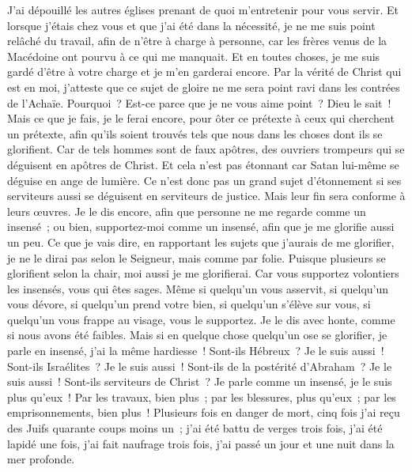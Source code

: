 \begin{multicols}{2}
J'ai dépouillé les autres églises prenant de quoi m'entretenir pour vous servir. Et lorsque j'étais chez vous et que j'ai été dans la nécessité, je ne me suis point relâché du travail, afin de n'être à charge à personne,
car les frères venus de la Macédoine ont pourvu à ce qui me manquait. Et en toutes choses, je me suis gardé d'être à votre charge et je m'en garderai encore.
Par la vérité de Christ qui est en moi, j'atteste que ce sujet de gloire ne me sera point ravi dans les contrées de l'Achaïe.
Pourquoi~? Est-ce parce que je ne vous aime point~? Dieu le sait~!
Mais ce que je fais, je le ferai encore, pour ôter ce prétexte à ceux qui cherchent un prétexte, afin qu'ils soient trouvés tels que nous dans les choses dont ils se glorifient.
Car de tels hommes sont de faux apôtres, des ouvriers trompeurs qui se déguisent en apôtres de Christ.
Et cela n'est pas étonnant car Satan lui-même se déguise en ange de lumière.
Ce n'est donc pas un grand sujet d'étonnement si ses serviteurs aussi se déguisent en serviteurs de justice. Mais leur fin sera conforme à leurs œuvres.
Je le dis encore, afin que personne ne me regarde comme un insensé~; ou bien, supportez-moi comme un insensé, afin que je me glorifie aussi un peu.
Ce que je vais dire, en rapportant les sujets que j'aurais de me glorifier, je ne le dirai pas selon le Seigneur, mais comme par folie.
Puisque plusieurs se glorifient selon la chair, moi aussi je me glorifierai.
Car vous supportez volontiers les insensés, vous qui êtes sages.
Même si quelqu'un vous asservit, si quelqu'un vous dévore, si quelqu'un prend votre bien, si quelqu'un s'élève sur vous, si quelqu'un vous frappe au visage, vous le supportez.
Je le dis avec honte, comme si nous avons été faibles. Mais si en quelque chose quelqu'un ose se glorifier, je parle en insensé, j'ai la même hardiesse~!
Sont-ils Hébreux~? Je le suis aussi~! Sont-ils Israélites~? Je le suis aussi~! Sont-ils de la postérité d'Abraham~? Je le suis aussi~!
Sont-ils serviteurs de Christ~? Je parle comme un insensé, je le suis plus qu'eux~! Par les travaux, bien plus~; par les blessures, plus qu'eux~; par les emprisonnements, bien plus~! Plusieurs fois en danger de mort,
cinq fois j'ai reçu des Juifs quarante coups moins un~;
j'ai été battu de verges trois fois, j'ai été lapidé une fois, j'ai fait naufrage trois fois, j'ai passé un jour et une nuit dans la mer profonde.

\end{multicols}
